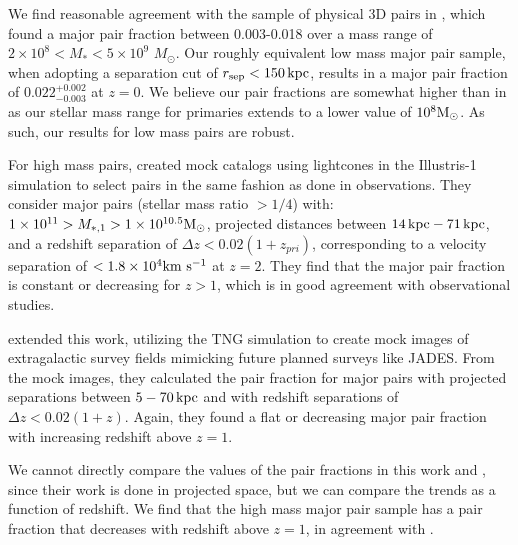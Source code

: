 \documentclass[twocolumn]{aastex631}
\begin{document}
        We find reasonable agreement with the sample of physical 3D pairs in \cite{Besla2018}, which found a major pair fraction between 0.003-0.018 over a mass range of $2\times 10^8 < M_* < 5 \times 10^9$ $M_\odot$.
        Our roughly equivalent low mass major pair sample, when adopting a separation cut of $r_{\mathrm{sep}}<150\mathrm{\,kpc}$, results in a major pair fraction of $0.022^{+0.002}_{-0.003}$ at $z=0$. We believe our pair fractions are somewhat higher than in \cite{Besla2018} as our stellar mass range for primaries extends to a lower value of $10^8\mathrm{M}_\odot$. As such, our results for low mass pairs are robust.  

        For high mass pairs, \citet{Snyder2017} created mock catalogs using lightcones in the Illustris-1 simulation to select pairs in the same fashion as done in observations. 
        They consider major pairs (stellar mass ratio $>1/4$) with: $1\times 10^{11}>M_{*,1} >1\times 10^{10.5}\mathrm{M}_\odot$, projected distances between $14\mathrm{\,kpc}-71\mathrm{\,kpc}$, and a redshift separation of $\Delta z<0.02(1+z_{pri})$, corresponding to a velocity separation of $<1.8\times10^4\mathrm{km}~\mathrm{s}^{-1}$ at $z=2$. 
        They find that the major pair fraction is constant or decreasing for $z>1$, which is in good agreement with observational studies.
        
        \citet{Snyder2023} extended this work, utilizing the TNG simulation to create mock images of extragalactic survey fields mimicking future planned surveys like JADES.
        From the mock images, they calculated the pair fraction for major pairs with projected separations between $5-70 \mathrm{\,kpc}$ and with redshift separations of $\Delta z< 0.02(1+z)$. 
        Again, they found a flat or decreasing major pair fraction with increasing redshift above $z=1$. 
        
        We cannot directly compare the values of the pair fractions in this work and \citet{Snyder2023}, since their work is done in projected space, but we can compare the trends as a function of redshift. 
        We find that the high mass major pair sample has a pair fraction that decreases with redshift above $z=1$, in agreement with \cite{Snyder2023}.
\end{document}

